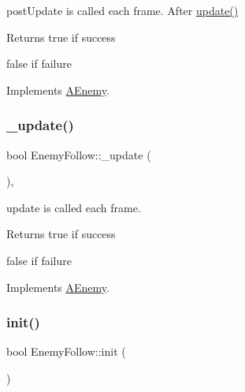 post\+Update is called each frame. After \hyperlink{class_a_enemy_a01e3b0313d6f29bf2cafe20f711c0550}{update()} 

\begin{DoxyReturn}{Returns}
true if success 

false if failure 
\end{DoxyReturn}


Implements \hyperlink{class_a_enemy_a78b010638f552c4ab11ff71e7b826b1b}{A\+Enemy}.

\mbox{\label{class_enemy_follow_a056cb50efd0967fddc9975920c927741}} 
\subsubsection{\texorpdfstring{\+\_\+update()}{\_update()}}
{\footnotesize\ttfamily bool Enemy\+Follow\+::\+\_\+update (\begin{DoxyParamCaption}{ }\end{DoxyParamCaption})\hspace{0.3cm}{\ttfamily [protected]}, {\ttfamily [virtual]}}



update is called each frame. 

\begin{DoxyReturn}{Returns}
true if success 

false if failure 
\end{DoxyReturn}


Implements \hyperlink{class_a_enemy_abefc22131eb1c618819c67c3c1415c08}{A\+Enemy}.

\mbox{\label{class_enemy_follow_a09963fbac6d395dbf653b6353412cf2b}} 
\subsubsection{\texorpdfstring{init()}{init()}}
{\footnotesize\ttfamily bool Enemy\+Follow\+::init (\begin{DoxyParamCaption}{ }\end{DoxyParamCaption})\hspace{0.3cm}{\ttfamily [virtual]}}



